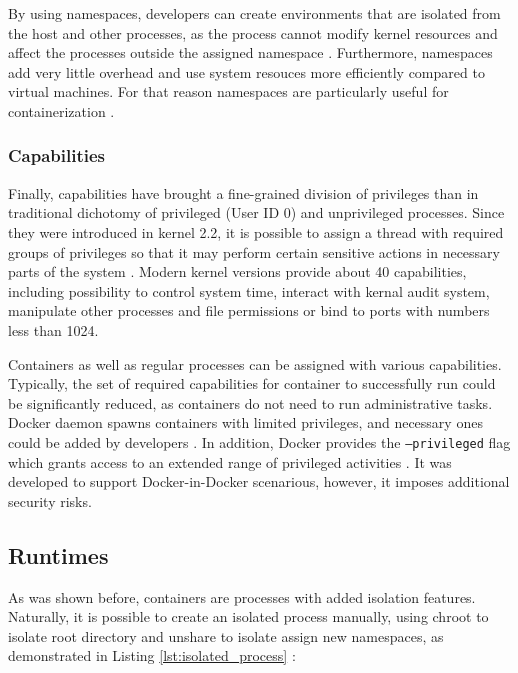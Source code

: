 By using namespaces, developers can create environments that are isolated from the host and other processes, as the process cannot modify kernel resources and affect the processes outside the assigned namespace \cite{d:dockersecurity}. Furthermore, namespaces add very little overhead and use system resouces more efficiently compared to virtual machines. For that reason namespaces are particularly useful for containerization \cite{c:1}.

\subsubsection{Capabilities}

Finally, capabilities have brought a fine-grained division of privileges than in traditional dichotomy of privileged (User ID 0) and unprivileged processes. Since they were introduced in kernel 2.2, it is possible to assign a thread with required groups of privileges so that it may perform certain sensitive actions in necessary parts of the system \cite{m:capabilities}. Modern kernel versions provide about 40 capabilities, including possibility to control system time, interact with kernal audit system, manipulate other processes and file permissions or bind to ports with numbers less than 1024.

Containers as well as regular processes can be assigned with various capabilities. Typically, the set of required capabilities for container to successfully run could be significantly reduced, as containers do not need to run administrative tasks. Docker daemon spawns containers with limited privileges, and necessary ones could be added by developers \cite{d:dockersecurity}. In addition, Docker provides the \texttt{--privileged} flag which grants access
to an extended range of privileged activities \cite{d:dockerrun}. It was developed to support Docker-in-Docker scenarious, however, it imposes additional security risks.

\clearpage
\subsection{Runtimes}

As was shown before, containers are processes with added isolation features. Naturally, it is possible to create an isolated process manually, using chroot to isolate root directory and unshare to isolate assign new namespaces, as demonstrated in Listing \ref{lst:isolated_process} \cite{book:rice}:

